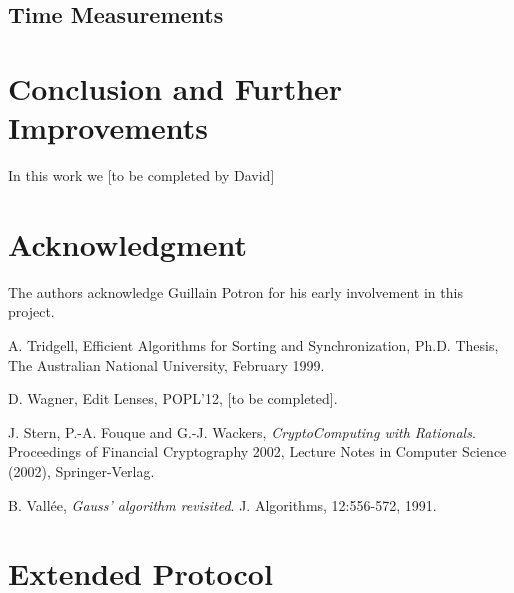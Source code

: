 \documentclass[11pt]{llncs}
\begin{document}
\subsection{Time Measurements}

\section{Conclusion and Further Improvements}

In this work we [to be completed by David]

\section{Acknowledgment}

The authors acknowledge Guillain Potron for his early involvement in this project.

\begin{thebibliography}{30}

 A. Tridgell, Efficient Algorithms for Sorting and Synchronization, Ph.D. Thesis, The Australian National University, February 1999.

 D. Wagner, Edit Lenses, POPL'12, [to be completed].

 J. Stern, P.-A. Fouque and G.-J. Wackers, {\sl CryptoComputing with Rationals}. Proceedings of Financial Cryptography 2002, Lecture Notes in Computer Science (2002), Springer-Verlag. \smallskip

 B. Vall\'ee, {\sl Gauss' algorithm revisited}. J. Algorithms, 12:556-572, 1991.

\end{thebibliography}

\appendix

\section{Extended Protocol}
\end{document}
